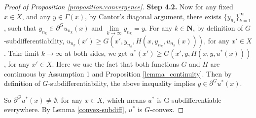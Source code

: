 \documentclass[a4paper, 11pt]{amsart}
\numberwithin{equation}{section}
\theoremstyle{plain}
\theoremstyle{definition}
\theoremstyle{remark}
\newcommand{\N}{\mathbf{N}}
\begin{document}
\begin{proof}[Proof of Proposition \ref{proposition:convergence}]
	
	{\bf Step 4.2.} Now for any fixed $x\in X$, and any $y\in \Gamma(x)$, by Cantor's diagonal argument, there exists $\{y_{n_k}\}_{k=1}^{\infty}$, such that $y_{n_k} \in \partial^G u_{n_k}(x)$ and $\lim\limits_{k\rightarrow \infty} y_{n_k} = y$.
	For any $k\in \N$, by definition of $G$-subdifferentiability,
	$u_{n_k}(x')\ge G(x', y_{n_k}, H(x, y_{n_k}, u_{n_k}(x)))$, for any $x' \in X$. Take limit $k \rightarrow \infty$ at both sides, we get $u^*(x') \ge G(x', y, H(x, y, u^*(x)))$, for any $x'\in X$. Here we use the fact that both functions $G$ and
		$H$ are continuous by Assumption 1 and Proposition \ref{lemma_continuity}.
Then by definition of $G$-subdifferentiability, the above inequality implies $y\in \partial ^G u^*(x)$. 

	So $\partial^G u^*(x)\neq \emptyset$, for any $x\in X$, which means $u^*$ is G-subdifferentiable everywhere. By Lemma \ref{convex-subdiff}, $u^*$ is $G$-convex.
\end{proof}

\vspace{0.3cm}
\end{document}
